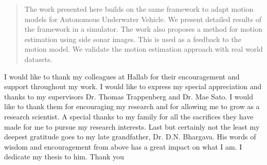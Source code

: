 \documentclass[12pt]{dalcsthesis}
\begin{document}
\begin{abstract}
The work presented here builds on the same framework to adapt motion models for Autonomous Underwater Vehicle. We present detailed results of the framework in a simulator. The work also proposes a method for motion estimation using side sonar images. This is used as a feedback to the motion model. We validate the motion estimation approach with real world datasets.

\end{abstract}

\begin{acknowledgements}
I would like to thank my colleagues at Hallab for their encouragement and support throughout my work. I would like to express my special appreciation and thanks to my supervisors Dr. Thomas Trappenberg and Dr. Mae Sato. I would like to thank them for encouraging my research and for allowing me to grow as a research scientist. A special thanks to my family for all the sacrifices they have made for me to pursue my research interests. Last but certainly not the least my deepest gratitude goes to my late grandfather, Dr. D.N. Bhargava. His words of wisdom and encouragement from above has a great impact on what I am. I dedicate my thesis to him. Thank you   
\end{acknowledgements}
\end{document}
